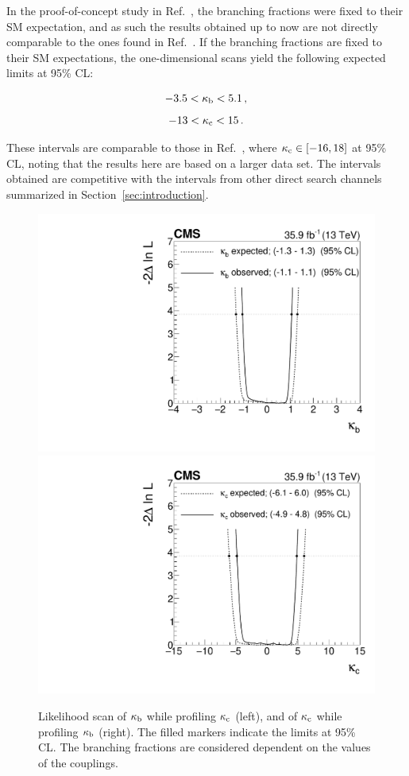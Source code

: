 % 
In the proof-of-concept study in Ref.~\cite{Bishara:2016jga}, the branching fractions were fixed to their SM expectation, and as such the results obtained up to now are not directly comparable to the ones found in Ref.~\cite{Bishara:2016jga}.
% 
If the branching fractions are fixed to their SM expectations, the one-dimensional scans yield the following expected limits at 95\% CL:
% 
\begin{linenomath*}
\begin{equation}
\label{eq:kappasensitivity_fixedSMBRs}
\begin{array}{c}
-3.5 < \kappa_{\mathrm{b}} < 5.1  \,,
 \\[8pt]
-13 < \kappa_{\mathrm{c}} < 15
\,.
\end{array}
\end{equation}
\end{linenomath*}
% 
These intervals are comparable to those in Ref.~\cite{Bishara:2016jga}, where $\kappa_{\mathrm{c}} \in [ -16, 18 ]$ at 95\% CL, noting that the results here are based on a larger data set.
% 
The intervals obtained are competitive with the intervals from other direct search channels summarized in Section~\ref{sec:introduction}.


\begin{figure}[hbtp]
  \begin{center}
    \includegraphics[width=0.49\linewidth]{img/interpretation/onekappascan_kbkc_couplingdependentBRs_kappab.pdf}
    \includegraphics[width=0.49\linewidth]{img/interpretation/onekappascan_kbkc_couplingdependentBRs_kappac.pdf}
    \caption{
        Likelihood scan of $\kappa_{\mathrm{b}}$ while profiling $\kappa_{\mathrm{c}}$ (left), and of $\kappa_{\mathrm{c}}$ while profiling $\kappa_{\mathrm{b}}$ (right).
        The filled markers indicate the limits at 95\% CL.
        The branching fractions are considered dependent on the values of the couplings.
        }
    \label{fig:kbkc-onedim-couplingdependent}
  \end{center}
\end{figure}

